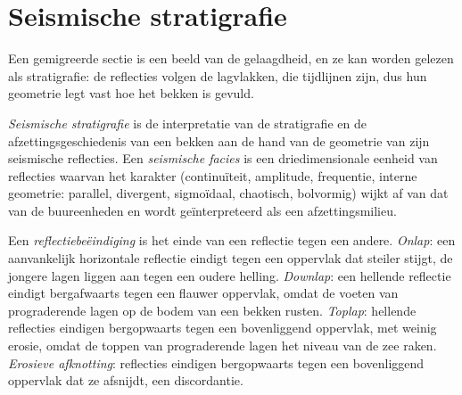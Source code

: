 \section{Seismische stratigrafie}

Een gemigreerde sectie is een beeld van de gelaagdheid, en ze kan worden gelezen als
stratigrafie: de reflecties volgen de lagvlakken, die
tijdlijnen zijn, dus hun geometrie legt vast hoe het bekken is gevuld.

\begin{definition}\label{def:b3:exploration-seismology:seismic-stratigraphy}
\emph{Seismische stratigrafie} is de interpretatie
van de stratigrafie en de afzettingsgeschiedenis van een bekken aan de hand van de geometrie
van zijn seismische reflecties. Een \emph{seismische facies} is een
driedimensionale eenheid van reflecties waarvan het karakter (continuïteit, amplitude,
frequentie, interne geometrie: parallel, divergent, sigmoïdaal, chaotisch, bolvormig)
wijkt af van dat van de buureenheden en wordt geïnterpreteerd als een
afzettingsmilieu.
\end{definition}

\begin{definition}[Reflectiebeëindigingen]\label{def:b3:exploration-seismology:terminations}
Een \emph{reflectiebeëindiging} is het einde van een
reflectie tegen een andere. \emph{Onlap}: een aanvankelijk horizontale
reflectie eindigt tegen een oppervlak dat steiler stijgt, de jongere lagen
liggen aan tegen een oudere helling. \emph{Downlap}: een hellende
reflectie eindigt bergafwaarts tegen een flauwer oppervlak, omdat de voeten van prograderende
lagen op de bodem van een bekken rusten. \emph{Toplap}: hellende
reflecties eindigen bergopwaarts tegen een bovenliggend oppervlak, met weinig erosie, omdat
de toppen van prograderende lagen het niveau van de zee raken. \emph{Erosieve
afknotting}: reflecties eindigen bergopwaarts tegen een
bovenliggend oppervlak dat ze afsnijdt, een discordantie.
\end{definition}


